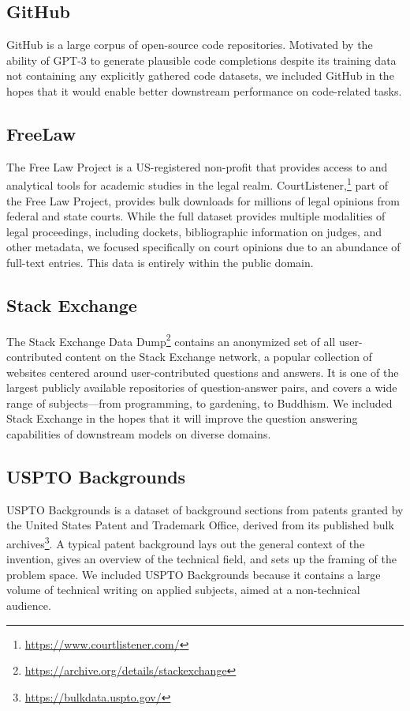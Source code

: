 \subsection{GitHub}

GitHub is a large corpus of open-source code repositories. Motivated by the ability of GPT-3 \citep{GPT3} to generate plausible code completions despite its training data not containing any explicitly gathered code datasets, we included GitHub in the hopes that it would enable better downstream performance on code-related tasks.

\subsection{FreeLaw}

The Free Law Project is a US-registered non-profit that provides access to and analytical tools for academic studies in the legal realm. CourtListener,\footnote{\url{https://www.courtlistener.com/}} part of the Free Law Project, provides bulk downloads for millions of legal opinions from federal and state courts. While the full dataset provides multiple modalities of legal proceedings, including dockets, bibliographic information on judges, and other metadata, we focused specifically on court opinions due to an abundance of full-text entries. This data is entirely within the public domain.

\subsection{Stack Exchange}

The Stack Exchange Data Dump\footnote{\url{https://archive.org/details/stackexchange}} contains an anonymized set of all user-contributed content on the Stack Exchange network, a popular collection of websites centered around user-contributed questions and answers. It is one of the largest publicly available repositories of question-answer pairs, and covers a wide range of subjects---from programming, to gardening, to Buddhism. We included Stack Exchange in the hopes that it will improve the question answering capabilities of downstream models on diverse domains.

\subsection{USPTO Backgrounds}

USPTO Backgrounds is a dataset of background sections from patents granted by the United States Patent and Trademark Office, derived from its published bulk archives\footnote{\url{https://bulkdata.uspto.gov/}}. A typical patent background lays out the general context of the invention, gives an overview of the technical field, and sets up the framing of the problem space. We included USPTO Backgrounds because it contains a large volume of technical writing on applied subjects, aimed at a non-technical audience.


